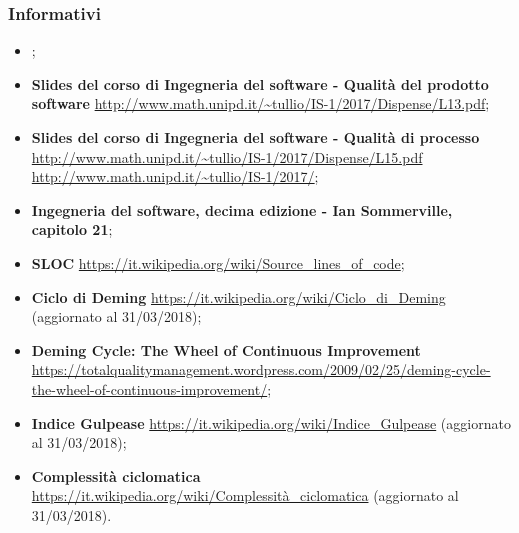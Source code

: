 \subsubsection{Informativi}
\begin{itemize}
	\item
	\textbf{\PdP{}};
	\item
	\textbf{Slides del corso di Ingegneria del software - Qualità del prodotto software}
	\url{http://www.math.unipd.it/~tullio/IS-1/2017/Dispense/L13.pdf};
	\item
	\textbf{Slides del corso di Ingegneria del software - Qualità di processo}
	\url{http://www.math.unipd.it/~tullio/IS-1/2017/Dispense/L15.pdf}
	\url{http://www.math.unipd.it/~tullio/IS-1/2017/};
	\item 
	\textbf{Ingegneria del software, decima edizione - Ian Sommerville, capitolo 21};
	\item
	\textbf{SLOC}
	\url{https://it.wikipedia.org/wiki/Source_lines_of_code};
	\item
	\textbf{Ciclo di Deming}
	\url{https://it.wikipedia.org/wiki/Ciclo_di_Deming} (aggiornato al 31/03/2018);
	\item
	\textbf{Deming Cycle: The Wheel of Continuous Improvement}
	\url{https://totalqualitymanagement.wordpress.com/2009/02/25/deming-cycle-the-wheel-of-continuous-improvement/};
	\item
	\textbf{Indice Gulpease}
	\url{https://it.wikipedia.org/wiki/Indice_Gulpease} (aggiornato al 31/03/2018);
	\item
	\textbf{Complessità ciclomatica}
	\url{https://it.wikipedia.org/wiki/Complessità_ciclomatica} (aggiornato al 31/03/2018).
	
\end{itemize}
